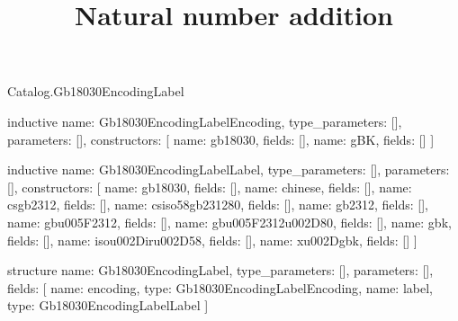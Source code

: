\begin{lexlean}{Catalog.Gb18030EncodingLabel}
\title{Natural number addition}
\begin{semanticmodule}
inductive{
  name: Gb18030EncodingLabelEncoding,
  type_parameters: [],
  parameters: [],
  constructors: [
    {name: gb18030, fields: []},
    {name: gBK, fields: []}
  ]
}

inductive{
  name: Gb18030EncodingLabelLabel,
  type_parameters: [],
  parameters: [],
  constructors: [
    {name: gb18030, fields: []},
    {name: chinese, fields: []},
    {name: csgb2312, fields: []},
    {name: csiso58gb231280, fields: []},
    {name: gb2312, fields: []},
    {name: gbu005F2312, fields: []},
    {name: gbu005F2312u002D80, fields: []},
    {name: gbk, fields: []},
    {name: isou002Diru002D58, fields: []},
    {name: xu002Dgbk, fields: []}
  ]
}

structure{
  name: Gb18030EncodingLabel,
  type_parameters: [],
  parameters: [],
  fields: [
    {name: encoding, type: Gb18030EncodingLabelEncoding},
    {name: label, type: Gb18030EncodingLabelLabel}
  ]
}
\end{semanticmodule}
\end{lexlean}
